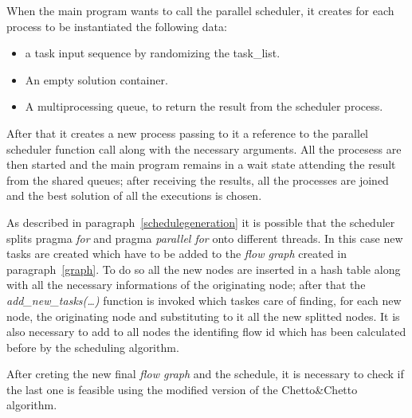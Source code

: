 \documentclass[a4paper,12pt,oneside]{book}
\begin{document}
When the main program wants to call the parallel scheduler, it creates for each process to be instantiated the following data:
\begin{itemize}
\item {a task input sequence by randomizing the task\_list.}
\item{An empty solution container.}
\item{A multiprocessing queue, to return the result from the scheduler process.}
\end{itemize}

After that it creates a new process passing to it a reference to the parallel scheduler function call along with the necessary arguments. All the procesess are then started and the main program remains in a wait state attending the result from the shared queues; after receiving the results, all the processes are joined and the best solution of all the executions is chosen.

As described in paragraph~\ref{schedulegeneration} it is possible that the scheduler splits pragma \emph{for} and pragma \emph{parallel for} onto different threads. In this case new tasks are created which have to be added to the \emph{flow graph} created in paragraph~\ref{graph}. To do so all the new nodes are inserted in a hash table along with all the necessary informations of the originating node; after that the \emph{add\_new\_tasks(\dots)} function is invoked which taskes care of finding, for each new node, the originating node and substituting to it all the new splitted nodes. It is also necessary to add to all nodes the identifing flow id which has been calculated before by the scheduling algorithm.

After creting the new final \emph{flow graph} and the schedule, it is necessary to check if the last one is feasible using the modified version of the Chetto\&Chetto algorithm.
\end{document}
